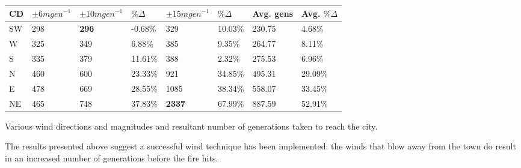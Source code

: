 \documentclass[11pt, a4paper, titlepage]{article}
\begin{document}
\begin{table}[h]
\begin{center}
      \begin{tabular}{|l|l|l|l|l|l|l|l|}
      \hline
      CD  & $\pm6mgen^{-1}$ & $\pm10mgen^{-1}$ & $\% \Delta$ & $\pm15mgen^{-1}$ & $\% \Delta$  & Avg. gens & Avg. $\% \Delta$ \\ \hline
      SW & 298                                            & \textbf{296}                                        & -0.68\% & 329                                  & 10.03\% & 230.75                            & 4.68\%      \\ \hline
      W       & 325                                            & 349                                        & 6.88\%  & 385                                  & 9.35\%  & 264.77                            & 8.11\%      \\ \hline
      S      & 335                                            & 379                                        & 11.61\% & 388                                  & 2.32\%  & 275.53                            & 6.96\%      \\ \hline
      N      & 460                                            & 600                                        & 23.33\% & 921                                  & 34.85\% & 495.31                            & 29.09\%     \\ \hline
      E       & 478                                            & 669                                        & 28.55\% & 1085                                 & 38.34\% & 558.07                            & 33.45\%     \\ \hline
      NE & 465                                            & 748                                        & 37.83\% & \textbf{2337}                                 & 67.99\% & 887.59                            & 52.91\%     \\ \hline
      \end{tabular}
\end{center}
Various wind directions and magnitudes and resultant number of generations taken to reach the city.
    \end{table}

    The results presented above suggest a successful wind technique has been implemented: the winds that blow away from the town do result in an increased number of generations before the fire hits.
    
\end{document}
